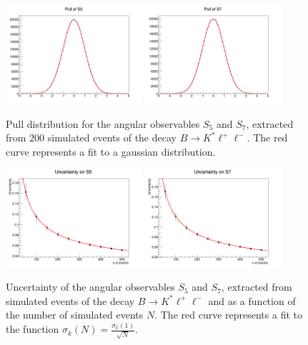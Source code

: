 \documentclass[aps,prd,reprint,nofootinbib,preprintnumbers]{revtex4}
\begin{document}
\begin{figure}[t]
        \centering
            \includegraphics[width=0.45\textwidth]{figs/pull-Q2_5_6_S5_200.png}
            \includegraphics[width=0.45\textwidth]{figs/pull-Q2_5_6_S7_200.png}
        \caption{Pull distribution for the angular observables $S_5$ and $S_7$, extracted from $200$ simulated events of the decay $B\to K^*\ell^+\ell^-$. The red curve represents a fit to a gaussian distribution.}
        \label{fig:pulls}
\end{figure}

\begin{figure}[t]
        \centering
            \includegraphics[width=0.45\textwidth]{figs/error-Q2_5_6_S5.png}
            \includegraphics[width=0.45\textwidth]{figs/error-Q2_5_6_S7.png}
        \caption{Uncertainty of the angular observables $S_5$ and $S_7$, extracted from simulated events of the decay $B\to K^*\ell^+\ell^-$ and as a function of the number of simulated events $N$. The red curve represents a fit to the function $\sigma_k(N) = \frac{\sigma_k(1)}{\sqrt{N}}$.}
        \label{fig:errors}
\end{figure}
\end{document}
